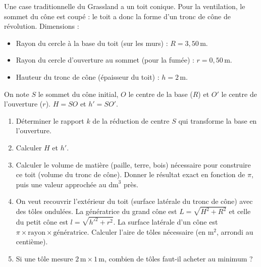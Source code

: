 \documentclass[11pt]{article}
\begin{document}
\begin{exercice}
\label{exo:toit}
Une case traditionnelle du Grassland a un toit conique. Pour la ventilation, le sommet du cône est coupé : le toit a donc la forme d'un tronc de cône de révolution.
Dimensions :
\begin{itemize}
    \item Rayon du cercle à la base du toit (sur les murs) : $R = 3,50\,\text{m}$.
    \item Rayon du cercle d'ouverture au sommet (pour la fumée) : $r = 0,50\,\text{m}$.
    \item Hauteur du tronc de cône (épaisseur du toit) : $h = 2\,\text{m}$.
\end{itemize}
On note $S$ le sommet du cône initial, $O$ le centre de la base ($R$) et $O'$ le centre de l'ouverture ($r$). $H = SO$ et $h' = SO'$.
\begin{enumerate}
    \item Déterminer le rapport $k$ de la réduction de centre $S$ qui transforme la base en l'ouverture.
    \item Calculer $H$ et $h'$.
    \item Calculer le volume de matière (paille, terre, bois) nécessaire pour construire ce toit (volume du tronc de cône). Donner le résultat exact en fonction de $\pi$, puis une valeur approchée au $\text{dm}^3$ près.
    \item On veut recouvrir l'extérieur du toit (surface latérale du tronc de cône) avec des tôles ondulées.
    La génératrice du grand cône est $L = \sqrt{H^2 + R^2}$ et celle du petit cône est $l = \sqrt{h'^2 + r^2}$.
    La surface latérale d'un cône est $\pi \times \text{rayon} \times \text{génératrice}$.
    Calculer l'aire de tôles nécessaire (en $\text{m}^2$, arrondi au centième).
    \item Si une tôle mesure $2\,\text{m} \times 1\,\text{m}$, combien de tôles faut-il acheter au minimum ?
\end{enumerate}
\end{exercice}
\end{document}
